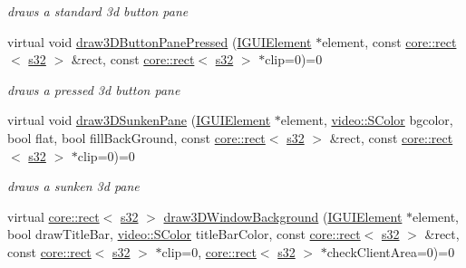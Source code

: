 \begin{DoxyCompactItemize}
\begin{DoxyCompactList}\small\item\em draws a standard 3d button pane \end{DoxyCompactList}\item 
virtual void \hyperlink{classirr_1_1gui_1_1IGUISkin_aa31f1ba128b2149bf48fead506d53503}{draw3\+D\+Button\+Pane\+Pressed} (\hyperlink{classirr_1_1gui_1_1IGUIElement}{I\+G\+U\+I\+Element} $\ast$element, const \hyperlink{classirr_1_1core_1_1rect}{core\+::rect}$<$ \hyperlink{namespaceirr_ac66849b7a6ed16e30ebede579f9b47c6}{s32} $>$ \&rect, const \hyperlink{classirr_1_1core_1_1rect}{core\+::rect}$<$ \hyperlink{namespaceirr_ac66849b7a6ed16e30ebede579f9b47c6}{s32} $>$ $\ast$clip=0)=0
\begin{DoxyCompactList}\small\item\em draws a pressed 3d button pane \end{DoxyCompactList}\item 
virtual void \hyperlink{classirr_1_1gui_1_1IGUISkin_ae9db467e7b631d5462c7d2092efbc531}{draw3\+D\+Sunken\+Pane} (\hyperlink{classirr_1_1gui_1_1IGUIElement}{I\+G\+U\+I\+Element} $\ast$element, \hyperlink{classirr_1_1video_1_1SColor}{video\+::\+S\+Color} bgcolor, bool flat, bool fill\+Back\+Ground, const \hyperlink{classirr_1_1core_1_1rect}{core\+::rect}$<$ \hyperlink{namespaceirr_ac66849b7a6ed16e30ebede579f9b47c6}{s32} $>$ \&rect, const \hyperlink{classirr_1_1core_1_1rect}{core\+::rect}$<$ \hyperlink{namespaceirr_ac66849b7a6ed16e30ebede579f9b47c6}{s32} $>$ $\ast$clip=0)=0
\begin{DoxyCompactList}\small\item\em draws a sunken 3d pane \end{DoxyCompactList}\item 
virtual \hyperlink{classirr_1_1core_1_1rect}{core\+::rect}$<$ \hyperlink{namespaceirr_ac66849b7a6ed16e30ebede579f9b47c6}{s32} $>$ \hyperlink{classirr_1_1gui_1_1IGUISkin_a615d368dc8290d7f2a635698e697a53f}{draw3\+D\+Window\+Background} (\hyperlink{classirr_1_1gui_1_1IGUIElement}{I\+G\+U\+I\+Element} $\ast$element, bool draw\+Title\+Bar, \hyperlink{classirr_1_1video_1_1SColor}{video\+::\+S\+Color} title\+Bar\+Color, const \hyperlink{classirr_1_1core_1_1rect}{core\+::rect}$<$ \hyperlink{namespaceirr_ac66849b7a6ed16e30ebede579f9b47c6}{s32} $>$ \&rect, const \hyperlink{classirr_1_1core_1_1rect}{core\+::rect}$<$ \hyperlink{namespaceirr_ac66849b7a6ed16e30ebede579f9b47c6}{s32} $>$ $\ast$clip=0, \hyperlink{classirr_1_1core_1_1rect}{core\+::rect}$<$ \hyperlink{namespaceirr_ac66849b7a6ed16e30ebede579f9b47c6}{s32} $>$ $\ast$check\+Client\+Area=0)=0

\end{DoxyCompactItemize}
